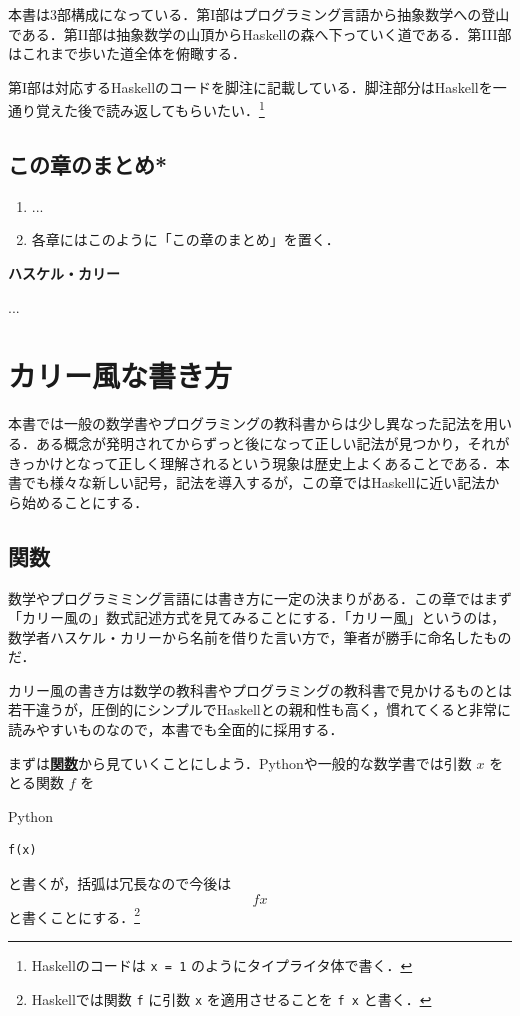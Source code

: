 \documentclass[a4paper,twocolumn]{jsbook}
\newcommand{\programminglanguage}[1]{\textsf{#1}}
\newcommand{\haskell}{\programminglanguage{Haskell}}
\newcommand{\python}{\programminglanguage{Python}}
\newenvironment{leader}{\begingroup\gt}{\endgroup}
\newenvironment{note}[1]{\begin{boxnote}\begin{center}\textbf{#1}\end{center}}{\end{boxnote}}
\newcommand{\keyword}[1]{{\underline{\textbf{#1}}}}
\newcommand{\code}[1]{\texttt{#1}}
\newenvironment{pythoncode}{\begin{itembox}[r]{\python}}{\end{itembox}}
\begin{document}
本書は3部構成になっている．第I部はプログラミング言語から抽象数学への登山である．第II部は抽象数学の山頂から\haskell の森へ下っていく道である．第III部はこれまで歩いた道全体を俯瞰する．

第I部は対応する\haskell のコードを脚注に記載している．脚注部分は\haskell を一通り覚えた後で読み返してもらいたい．\footnote{\haskell のコードは \code{x = 1} のようにタイプライタ体で書く．}

\section{この章のまとめ*}

\begin{enumerate}
\item ...
\item 各章にはこのように「この章のまとめ」を置く．
\end{enumerate}


\begin{note}{ハスケル・カリー}
...
\end{note}


\chapter{カリー風な書き方}
\label{ch:curry}

\begin{leader}
本書では一般の数学書やプログラミングの教科書からは少し異なった記法を用いる．ある概念が発明されてからずっと後になって正しい記法が見つかり，それがきっかけとなって正しく理解されるという現象は歴史上よくあることである．本書でも様々な新しい記号，記法を導入するが，この章では\haskell に近い記法から始めることにする．
\end{leader}

\section{関数}

数学やプログラミミング言語には書き方に一定の決まりがある．この章ではまず「カリー風の」数式記述方式を見てみることにする．「カリー風」というのは，数学者ハスケル・カリーから名前を借りた言い方で，筆者が勝手に命名したものだ．

カリー風の書き方は数学の教科書やプログラミングの教科書で見かけるものとは若干違うが，圧倒的にシンプルで\haskell との親和性も高く，慣れてくると非常に読みやすいものなので，本書でも全面的に採用する．

まずは\keyword{関数}から見ていくことにしよう．\python や一般的な数学書では引数 $x$ をとる関数 $f$ を
\begin{pythoncode}
\begin{verbatim}
f(x)
\end{verbatim}
\end{pythoncode}
と書くが，括弧は冗長なので今後は
\begin{equation}
fx
\end{equation}
と書くことにする．\footnote{\haskell では関数 \code{f} に引数 \code{x} を適用させることを  \code{f x} と書く．}
\end{document}
